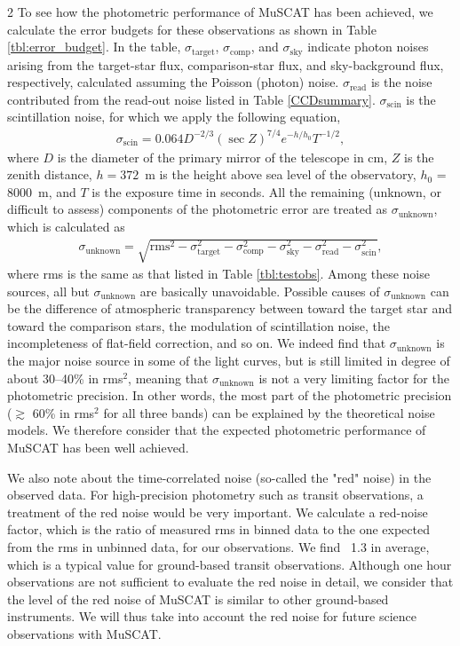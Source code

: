 \documentclass[a4paper,12pt]{spieman}  %
\begin{document}
\begin{spacing}{2}
To see how the photometric performance of MuSCAT has been achieved,
we calculate the error budgets for these observations as shown in Table \ref{tbl:error_budget}.
In the table, $\sigma_\mathrm{target}$, $\sigma_\mathrm{comp}$, and $\sigma_\mathrm{sky}$
indicate photon noises arising from the target-star flux, comparison-star flux, and sky-background flux, respectively,
calculated assuming the Poisson (photon) noise.
$\sigma_\mathrm{read}$ is the noise contributed from the read-out noise listed in Table \ref{CCDsummary}.
$\sigma_\mathrm{scin}$ is the scintillation noise, for which we apply the following equation,
\begin{eqnarray}
\sigma_\mathrm{scin} = 0.064 D^{-2/3} (\sec Z)^{7/4} e^{-h/h_0} T^{-1/2},
\end{eqnarray}
where $D$ is the diameter of the primary mirror of the telescope in cm,
$Z$ is the zenith distance, $h=372$~m is the height above sea level of the observatory,
$h_0$ = 8000~m, and $T$ is the exposure time in seconds\cite{1967AJ.....72..747Y,1998PASP..110..610D}.
All the remaining (unknown, or difficult to assess) components of the photometric error are
treated as $\sigma_\mathrm{unknown}$, which is calculated as 
\begin{eqnarray}
\sigma_\mathrm{unknown} = \sqrt{\mathrm{rms}^2 - \sigma_\mathrm{target}^2 - \sigma_\mathrm{comp}^2 - \sigma_\mathrm{sky}^2 - \sigma_\mathrm{read}^2 - \sigma_\mathrm{scin}^2},
\end{eqnarray} where rms is the same as that listed in Table \ref{tbl:testobs}. 
Among these noise sources, all but $\sigma_\mathrm{unknown}$ are basically unavoidable.
Possible causes of $\sigma_\mathrm{unknown}$ can be the difference of
atmospheric transparency between toward the target star and toward the comparison stars,
the modulation of scintillation noise, the incompleteness of flat-field correction, and so on.
We indeed find that $\sigma_\mathrm{unknown}$ is the major noise source in some of the light curves,
but is still limited in degree of about 30--40\% in rms$^2$,
meaning that $\sigma_\mathrm{unknown}$ is not a very limiting factor for the photometric precision.
In other words, the most part of the photometric precision ($\gtrsim$ 60\% in rms$^2$ 
for all three bands) can be explained by the theoretical noise models.
We therefore consider that the expected photometric performance of MuSCAT has been well achieved.

We also note about the time-correlated noise (so-called the "red" noise) in the observed data.
For high-precision photometry such as transit observations,
a treatment of the red noise would be very important\cite{2006MNRAS.373..231P}.
We calculate a red-noise factor, which is the ratio of measured rms in binned data
to the one expected from the rms in unbinned data, for our observations.
We find ~1.3 in average, which is a typical value for ground-based transit observations.
Although one hour observations are not sufficient to evaluate the red noise in detail, we consider that
the level of the red noise of MuSCAT is similar to other ground-based instruments.
We will thus take into account the red noise for future science observations with MuSCAT.



\end{spacing}
\end{document}
